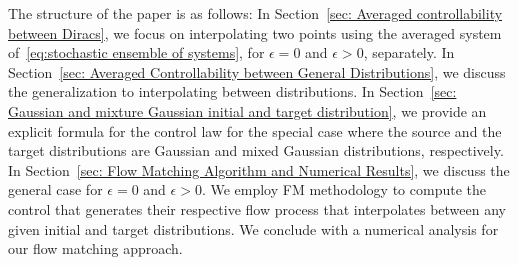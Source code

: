 \documentclass[12pt]{amsart}
\renewcommand{\(}{\left (}
\renewcommand{\)}{\right )}
\numberwithin{equation}{section}
\begin{document}
The structure of the paper is as follows: In Section~\ref{sec: Averaged controllability between Diracs}, we focus on interpolating two points using the averaged system of~\eqref{eq:stochastic ensemble of systems}, for $\epsilon=0$ and $\epsilon> 0$, separately. In Section~\ref{sec: Averaged Controllability between General Distributions}, we discuss the generalization to interpolating between distributions. In Section~\ref{sec: Gaussian and mixture Gaussian initial and target distribution}, we provide an explicit formula for the control law for the special case where the source and the target distributions are Gaussian and mixed Gaussian distributions, respectively. In Section~\ref{sec: Flow Matching Algorithm and Numerical Results}, we discuss the general case for $\epsilon=0$ and $\epsilon> 0$. We employ FM methodology to compute the control that generates their respective flow process that interpolates between any given initial and target distributions. We conclude with a numerical analysis for our flow matching approach.

\end{document}
